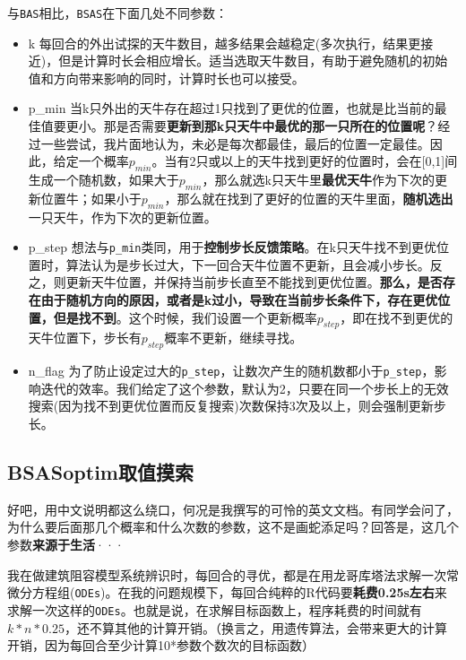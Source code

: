 \documentclass[]{ctexbook}
\providecommand{\tightlist}{%
  \setlength{\itemsep}{0pt}\setlength{\parskip}{0pt}}
\theoremstyle{definition}
\theoremstyle{definition}
\theoremstyle{definition}
\theoremstyle{remark}
\begin{document}
与\texttt{BAS}相比，\texttt{BSAS}在下面几处不同参数：

\begin{itemize}
\tightlist
\item
  k
  每回合的外出试探的天牛数目，越多结果会越稳定(多次执行，结果更接近)，但是计算时长会相应增长。适当选取天牛数目，有助于避免随机的初始值和方向带来影响的同时，计算时长也可以接受。
\item
  p\_min
  当k只外出的天牛存在超过1只找到了更优的位置，也就是比当前的最佳值要更小。那是否需要\textbf{更新到那k只天牛中最优的那一只所在的位置呢}？经过一些尝试，我片面地认为，未必是每次都最佳，最后的位置一定最佳。因此，给定一个概率\(p_{min}\)。当有2只或以上的天牛找到更好的位置时，会在{[}0,1{]}间生成一个随机数，如果大于\(p_{min}\)，那么就选k只天牛里\textbf{最优天牛}作为下次的更新位置牛；如果小于\(p_{min}\)，那么就在找到了更好的位置的天牛里面，\textbf{随机选出}一只天牛，作为下次的更新位置。
\item
  p\_step
  想法与\texttt{p\_min}类同，用于\textbf{控制步长反馈策略}。在k只天牛找不到更优位置时，算法认为是步长过大，下一回合天牛位置不更新，且会减小步长。反之，则更新天牛位置，并保持当前步长直至不能找到更优位置。\textbf{那么，是否存在由于随机方向的原因，或者是k过小，导致在当前步长条件下，存在更优位置，但是找不到}。这个时候，我们设置一个更新概率\(p_{step}\)，即在找不到更优的天牛位置下，步长有\(p_{step}\)概率不更新，继续寻找。
\item
  n\_flag
  为了防止设定过大的\texttt{p\_step}，让数次产生的随机数都小于\texttt{p\_step}，影响迭代的效率。我们给定了这个参数，默认为2，只要在同一个步长上的无效搜索(因为找不到更优位置而反复搜索)次数保持3次及以上，则会强制更新步长。
\end{itemize}

\subsection{BSASoptim取值摸索}\label{BSAStrick}

好吧，用中文说明都这么绕口，何况是我撰写的可怜的英文文档。有同学会问了，为什么要后面那几个概率和什么次数的参数，这不是画蛇添足吗？回答是，这几个参数\textbf{来源于生活}···

我在做建筑阻容模型系统辨识时，每回合的寻优，都是在用龙哥库塔法求解一次常微分方程组(\texttt{ODEs})。在我的问题规模下，每回合纯粹的R代码要\textbf{耗费0.25s左右}来求解一次这样的\texttt{ODEs}。也就是说，在求解目标函数上，程序耗费的时间就有\(k*n*0.25\)，还不算其他的计算开销。（换言之，用遗传算法，会带来更大的计算开销，因为每回合至少计算10*参数个数次的目标函数）
\end{document}
